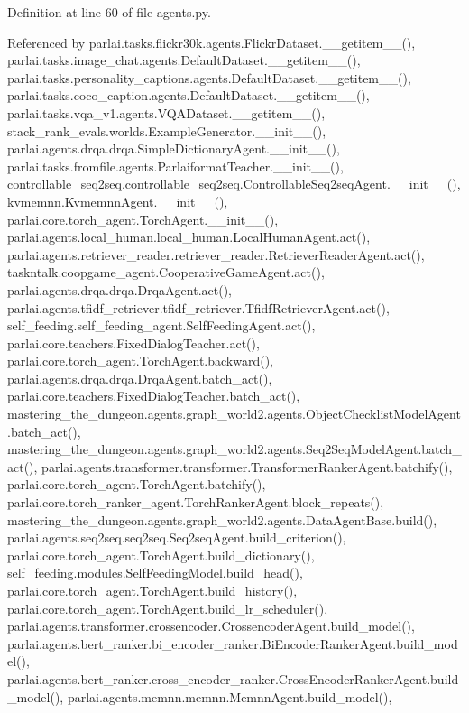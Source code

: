 Definition at line 60 of file agents.\+py.



Referenced by parlai.\+tasks.\+flickr30k.\+agents.\+Flickr\+Dataset.\+\_\+\+\_\+getitem\+\_\+\+\_\+(), parlai.\+tasks.\+image\+\_\+chat.\+agents.\+Default\+Dataset.\+\_\+\+\_\+getitem\+\_\+\+\_\+(), parlai.\+tasks.\+personality\+\_\+captions.\+agents.\+Default\+Dataset.\+\_\+\+\_\+getitem\+\_\+\+\_\+(), parlai.\+tasks.\+coco\+\_\+caption.\+agents.\+Default\+Dataset.\+\_\+\+\_\+getitem\+\_\+\+\_\+(), parlai.\+tasks.\+vqa\+\_\+v1.\+agents.\+V\+Q\+A\+Dataset.\+\_\+\+\_\+getitem\+\_\+\+\_\+(), stack\+\_\+rank\+\_\+evals.\+worlds.\+Example\+Generator.\+\_\+\+\_\+init\+\_\+\+\_\+(), parlai.\+agents.\+drqa.\+drqa.\+Simple\+Dictionary\+Agent.\+\_\+\+\_\+init\+\_\+\+\_\+(), parlai.\+tasks.\+fromfile.\+agents.\+Parlaiformat\+Teacher.\+\_\+\+\_\+init\+\_\+\+\_\+(), controllable\+\_\+seq2seq.\+controllable\+\_\+seq2seq.\+Controllable\+Seq2seq\+Agent.\+\_\+\+\_\+init\+\_\+\+\_\+(), kvmemnn.\+Kvmemnn\+Agent.\+\_\+\+\_\+init\+\_\+\+\_\+(), parlai.\+core.\+torch\+\_\+agent.\+Torch\+Agent.\+\_\+\+\_\+init\+\_\+\+\_\+(), parlai.\+agents.\+local\+\_\+human.\+local\+\_\+human.\+Local\+Human\+Agent.\+act(), parlai.\+agents.\+retriever\+\_\+reader.\+retriever\+\_\+reader.\+Retriever\+Reader\+Agent.\+act(), taskntalk.\+coopgame\+\_\+agent.\+Cooperative\+Game\+Agent.\+act(), parlai.\+agents.\+drqa.\+drqa.\+Drqa\+Agent.\+act(), parlai.\+agents.\+tfidf\+\_\+retriever.\+tfidf\+\_\+retriever.\+Tfidf\+Retriever\+Agent.\+act(), self\+\_\+feeding.\+self\+\_\+feeding\+\_\+agent.\+Self\+Feeding\+Agent.\+act(), parlai.\+core.\+teachers.\+Fixed\+Dialog\+Teacher.\+act(), parlai.\+core.\+torch\+\_\+agent.\+Torch\+Agent.\+backward(), parlai.\+agents.\+drqa.\+drqa.\+Drqa\+Agent.\+batch\+\_\+act(), parlai.\+core.\+teachers.\+Fixed\+Dialog\+Teacher.\+batch\+\_\+act(), mastering\+\_\+the\+\_\+dungeon.\+agents.\+graph\+\_\+world2.\+agents.\+Object\+Checklist\+Model\+Agent.\+batch\+\_\+act(), mastering\+\_\+the\+\_\+dungeon.\+agents.\+graph\+\_\+world2.\+agents.\+Seq2\+Seq\+Model\+Agent.\+batch\+\_\+act(), parlai.\+agents.\+transformer.\+transformer.\+Transformer\+Ranker\+Agent.\+batchify(), parlai.\+core.\+torch\+\_\+agent.\+Torch\+Agent.\+batchify(), parlai.\+core.\+torch\+\_\+ranker\+\_\+agent.\+Torch\+Ranker\+Agent.\+block\+\_\+repeats(), mastering\+\_\+the\+\_\+dungeon.\+agents.\+graph\+\_\+world2.\+agents.\+Data\+Agent\+Base.\+build(), parlai.\+agents.\+seq2seq.\+seq2seq.\+Seq2seq\+Agent.\+build\+\_\+criterion(), parlai.\+core.\+torch\+\_\+agent.\+Torch\+Agent.\+build\+\_\+dictionary(), self\+\_\+feeding.\+modules.\+Self\+Feeding\+Model.\+build\+\_\+head(), parlai.\+core.\+torch\+\_\+agent.\+Torch\+Agent.\+build\+\_\+history(), parlai.\+core.\+torch\+\_\+agent.\+Torch\+Agent.\+build\+\_\+lr\+\_\+scheduler(), parlai.\+agents.\+transformer.\+crossencoder.\+Crossencoder\+Agent.\+build\+\_\+model(), parlai.\+agents.\+bert\+\_\+ranker.\+bi\+\_\+encoder\+\_\+ranker.\+Bi\+Encoder\+Ranker\+Agent.\+build\+\_\+model(), parlai.\+agents.\+bert\+\_\+ranker.\+cross\+\_\+encoder\+\_\+ranker.\+Cross\+Encoder\+Ranker\+Agent.\+build\+\_\+model(), parlai.\+agents.\+memnn.\+memnn.\+Memnn\+Agent.\+build\+\_\+model(), 